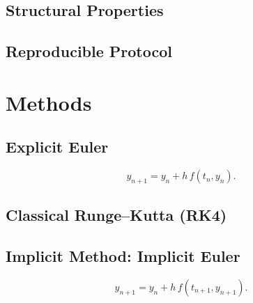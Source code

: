 \documentclass[11pt]{article}
\begin{document}
\subsection{Structural Properties}

\subsection{Reproducible Protocol}

\section{Methods}

\subsection{Explicit Euler}
\begin{equation}
  y_{n+1} = y_n + h\, f(t_n, y_n).
\end{equation}

\subsection{Classical Runge--Kutta (RK4)}

\subsection{Implicit Method: Implicit Euler}
\begin{equation}
  y_{n+1} = y_n + h\, f(t_{n+1}, y_{n+1}).
\end{equation}
\end{document}
